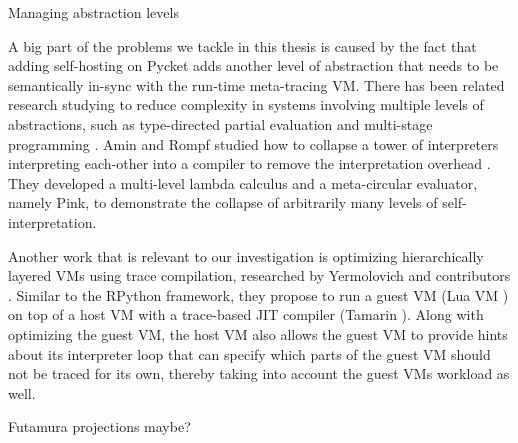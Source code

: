         \begin{paragraph-here}%
            Managing abstraction levels

            A big part of the problems we tackle in this thesis is caused by the
            fact that adding self-hosting on Pycket adds another level of
            abstraction that needs to be semantically in-sync with the run-time
            meta-tracing VM. There has been related research studying to reduce
            complexity in systems involving multiple levels of abstractions, such
            as type-directed partial evaluation \cite{tdpe:99} and multi-stage
            programming \cite{multi-stage:17}. Amin and Rompf studied how to
            collapse a tower of interpreters interpreting each-other into a
            compiler to remove the interpretation overhead
            \cite{collapse:17}. They developed a multi-level lambda calculus and a
            meta-circular evaluator, namely Pink, to demonstrate the collapse of
            arbitrarily many levels of self-interpretation.

            Another work that is relevant to our investigation is optimizing
            hierarchically layered VMs using trace compilation, researched by
            Yermolovich and contributors \cite{layering:09}. Similar to the
            RPython framework, they propose to run a guest VM (Lua VM
            \cite{LuaJITLanguageToolkit}) on top of a host VM with a trace-based JIT compiler
            (Tamarin \cite{tamarin}). Along with optimizing the guest VM, the host
            VM also allows the guest VM to provide hints about its interpreter
            loop that can specify which parts of the guest VM should not be traced
            for its own, thereby taking into account the guest VMs workload as
            well.

            Futamura projections maybe?
        \end{paragraph-here}

